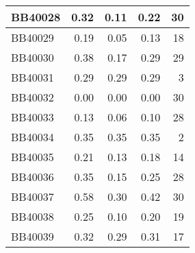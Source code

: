 \begin{longtable}{|l|r|r|r||r|}
	\hline
	BB40028 & \cellcolor[rgb]{ .988,  1,  .992}0.32 & \cellcolor[rgb]{ .384,  .745,  .478}0.11 & \cellcolor[rgb]{ .714,  .882,  .761}0.22 & \cellcolor[rgb]{ .973,  .412,  .42}30 \\
	\hline
	BB40029 & \cellcolor[rgb]{ .988,  1,  .992}0.19 & \cellcolor[rgb]{ .384,  .745,  .478}0.05 & \cellcolor[rgb]{ .729,  .89,  .773}0.13 & \cellcolor[rgb]{ .98,  .643,  .655}18 \\
	\hline
	BB40030 & \cellcolor[rgb]{ .988,  1,  .992}0.38 & \cellcolor[rgb]{ .384,  .745,  .478}0.17 & \cellcolor[rgb]{ .741,  .894,  .78}0.29 & \cellcolor[rgb]{ .976,  .431,  .439}29 \\
	\hline
	BB40031 & \cellcolor[rgb]{ .988,  1,  .992}0.29 & \cellcolor[rgb]{ .988,  1,  .992}0.29 & \cellcolor[rgb]{ .988,  1,  .992}0.29 & \cellcolor[rgb]{ .988,  .933,  .945}3 \\
	\hline
	BB40032 & \cellcolor[rgb]{ .988,  1,  .992}0.00 & \cellcolor[rgb]{ .988,  1,  .992}0.00 & \cellcolor[rgb]{ .988,  1,  .992}0.00 & \cellcolor[rgb]{ .973,  .412,  .42}30 \\
	\hline
	BB40033 & \cellcolor[rgb]{ .988,  1,  .992}0.13 & \cellcolor[rgb]{ .384,  .745,  .478}0.06 & \cellcolor[rgb]{ .706,  .878,  .753}0.10 & \cellcolor[rgb]{ .976,  .451,  .459}28 \\
	\hline
	BB40034 & \cellcolor[rgb]{ .988,  1,  .992}0.35 & \cellcolor[rgb]{ .988,  1,  .992}0.35 & \cellcolor[rgb]{ .988,  1,  .992}0.35 & \cellcolor[rgb]{ .988,  .953,  .965}2 \\
	\hline
	BB40035 & \cellcolor[rgb]{ .988,  1,  .992}0.21 & \cellcolor[rgb]{ .384,  .745,  .478}0.13 & \cellcolor[rgb]{ .749,  .898,  .788}0.18 & \cellcolor[rgb]{ .984,  .722,  .729}14 \\
	\hline
	BB40036 & \cellcolor[rgb]{ .988,  1,  .992}0.35 & \cellcolor[rgb]{ .384,  .745,  .478}0.15 & \cellcolor[rgb]{ .675,  .867,  .725}0.25 & \cellcolor[rgb]{ .976,  .451,  .459}28 \\
	\hline
	BB40037 & \cellcolor[rgb]{ .988,  1,  .992}0.58 & \cellcolor[rgb]{ .384,  .745,  .478}0.30 & \cellcolor[rgb]{ .639,  .851,  .694}0.42 & \cellcolor[rgb]{ .973,  .412,  .42}30 \\
	\hline
	BB40038 & \cellcolor[rgb]{ .988,  1,  .992}0.25 & \cellcolor[rgb]{ .384,  .745,  .478}0.10 & \cellcolor[rgb]{ .784,  .914,  .82}0.20 & \cellcolor[rgb]{ .98,  .624,  .635}19 \\
	\hline
	BB40039 & \cellcolor[rgb]{ .988,  1,  .992}0.32 & \cellcolor[rgb]{ .384,  .745,  .478}0.29 & \cellcolor[rgb]{ .773,  .91,  .808}0.31 & \cellcolor[rgb]{ .98,  .663,  .675}17 \\

\end{longtable}
